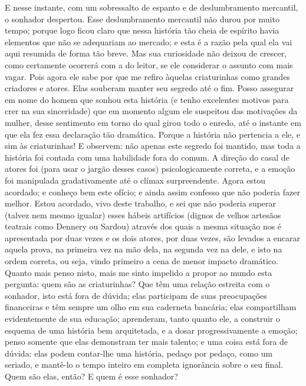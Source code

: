 E nesse instante, com um sobressalto de espanto e de deslumbramento
mercantil, o sonhador despertou.  Esse deslumbramento mercantil não
durou por muito tempo; porque logo ficou claro que nessa história tão
cheia de espírito havia elementos que não se adequariam ao mercado; e
esta é a razão pela qual ela vai aqui resumida de forma tão breve.  Mas
sua curiosidade não deixou de crescer, como certamente ocorrerá com a
do leitor, se ele considerar o assunto com mais vagar.  Pois agora
ele sabe por que me refiro àquelas criaturinhas como grandes
criadores e atores.  Elas souberam manter seu segredo até o fim.  Posso
assegurar em nome do homem que sonhou esta história (e tenho excelentes
motivos para crer na sua sinceridade) que em momento algum ele
suspeitou das motivações da mulher, desse sentimento em torno do qual
girou todo o enredo, até o instante em que ela fez essa declaração tão
dramática.  Porque a história não pertencia a ele, e sim às
criaturinhas!  E observem: não apenas este segredo foi mantido, mas
toda a história foi contada com uma habilidade fora do comum.  A
direção do casal de atores foi (para usar o jargão desses casos)
psicologicamente correta, e a emoção foi manipulada gradativamente até
o clímax surpreendente.  Agora estou acordado; e conheço bem este
ofício; e ainda assim confesso que não poderia fazer melhor.  Estou
acordado, vivo deste trabalho, e sei que não poderia superar (talvez
nem mesmo igualar) esses hábeis artifícios (dignos de velhos artesãos
teatrais como Dennery ou Sardou) através dos quais a mesma situação nos
é apresentada por duas vezes e os dois atores, por duas vezes, são
levados a encarar aquela prova, na primeira vez na mão dela, na segunda
vez na dele, e isto na ordem correta, ou seja, vindo primeiro a cena de
menor impacto dramático.  Quanto mais penso nisto, mais me sinto
impelido a propor ao mundo esta pergunta: quem são as criaturinhas? 
Que têm uma relação estreita com o sonhador, isto está fora de dúvida;
elas participam de suas preocupações financeiras e têm sempre um olho
em sua caderneta bancária; elas compartilham evidentemente de sua
educação; aprenderam, tanto quanto ele, a construir o esquema de uma
história bem arquitetada, e a dosar progressivamente a emoção; penso
somente que elas demonstram ter mais talento; e uma coisa está fora de
dúvida: elas podem contar-lhe uma história, pedaço por pedaço, como um
seriado, e mantê-lo o tempo inteiro em completa ignorância sobre o seu
final.  Quem são elas, então?  E quem é esse sonhador?

